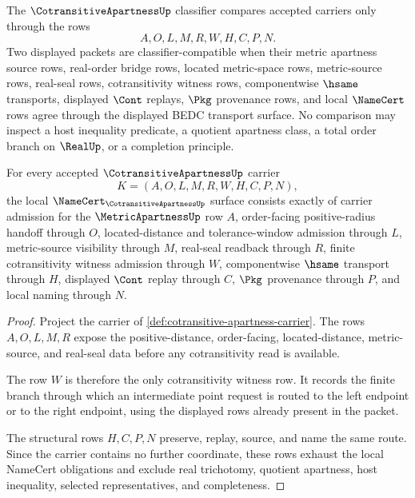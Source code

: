 \begin{definition}
\label{def:cotransitive-apartness-classifier}
The $\CotransitiveApartnessUp$ classifier compares accepted carriers only through the rows
$$
A,O,L,M,R,W,H,C,P,N .
$$
Two displayed packets are classifier-compatible when their metric apartness source rows, real-order bridge rows, located metric-space rows, metric-source rows, real-seal rows, cotransitivity witness rows, componentwise $\hsame$ transports, displayed $\Cont$ replays, $\Pkg$ provenance rows, and local $\NameCert$ rows agree through the displayed BEDC transport surface. No comparison may inspect a host inequality predicate, a quotient apartness class, a total order branch on $\RealUp$, or a completion principle.
\end{definition}

\begin{theorem}
\label{thm:cotransitive-apartness-namecert-obligations}
For every accepted $\CotransitiveApartnessUp$ carrier
$$
K=(A,O,L,M,R,W,H,C,P,N),
$$
the local $\NameCert_{\CotransitiveApartnessUp}$ surface consists exactly of carrier admission for the $\MetricApartnessUp$ row $A$, order-facing positive-radius handoff through $O$, located-distance and tolerance-window admission through $L$, metric-source visibility through $M$, real-seal readback through $R$, finite cotransitivity witness admission through $W$, componentwise $\hsame$ transport through $H$, displayed $\Cont$ replay through $C$, $\Pkg$ provenance through $P$, and local naming through $N$.
\end{theorem}
\begin{proof}
Project the carrier of \autoref{def:cotransitive-apartness-carrier}. The rows $A,O,L,M,R$ expose the positive-distance, order-facing, located-distance, metric-source, and real-seal data before any cotransitivity read is available.

The row $W$ is therefore the only cotransitivity witness row. It records the finite branch through which an intermediate point request is routed to the left endpoint or to the right endpoint, using the displayed rows already present in the packet.

The structural rows $H,C,P,N$ preserve, replay, source, and name the same route. Since the carrier contains no further coordinate, these rows exhaust the local NameCert obligations and exclude real trichotomy, quotient apartness, host inequality, selected representatives, and completeness.
\end{proof}

